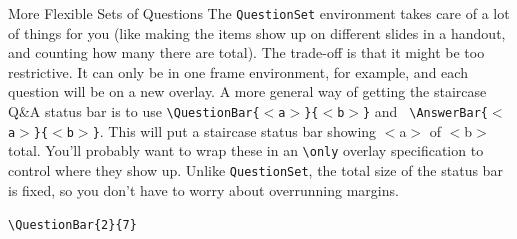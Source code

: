 \documentclass[10pt]{beamer}
\begin{document}
\begin{frame}{More Flexible Sets of Questions}
The \texttt{QuestionSet} environment takes care of a lot of things for you (like making the items show up on different slides in a handout, and counting how many there are total). The trade-off is that it might be too restrictive. It can only be in one frame environment, for example, and each question will be on a new overlay.
\vfill
A more general way of getting the staircase Q\&A status bar is to use \texttt{\textbackslash QuestionBar\{$<$a$>$\}\{$<$b$>$\}}
and \texttt{ \textbackslash AnswerBar\{$<$a$>$\}\{$<$b$>$\}}. This will put a staircase status bar showing $<$a$>$ of $<$b$>$ total. You'll probably want to wrap these in an \texttt{\textbackslash only} overlay specification to control where they show up. Unlike \texttt{QuestionSet}, the total size of the status bar is fixed, so you don't have to worry about overrunning margins.\vfill

\texttt{\textbackslash QuestionBar\{2\}\{7\}}
\end{frame}

% 
%

\end{document}

